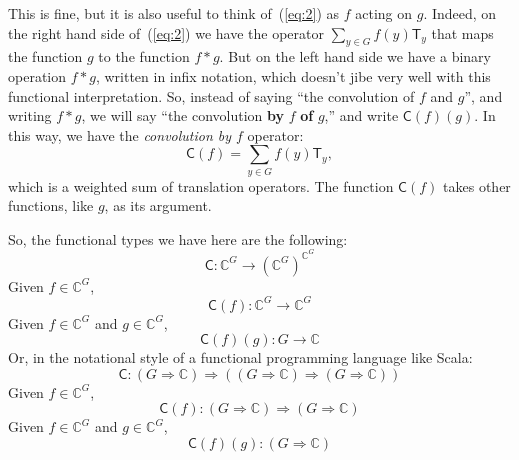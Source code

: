 \documentclass[11pt]{article}
\newcommand\C{\ensuremath{\mathbb{C}}}
\newcommand{\lt}[1]{\ensuremath{\mathsf{#1}}}
\newcommand{\T}{\lt{T}}       %
\newcommand\conv{\lt{C}}
\begin{document}
 This is fine, but it is also useful to think of~(\ref{eq:2}) as $f$ acting
on $g$.  Indeed, on the right hand side of~(\ref{eq:2}) we have the operator 
$\sum_{y \in G} f(y) \T_y$ that maps the function $g$ to the function $f*g$.  But
on the left hand side we have a binary operation $f*g$, written in infix
notation, which doesn't jibe very well with this functional interpretation.  So,
instead of saying ``the convolution of $f$ and $g$'', and writing $f*g$, we will
say
``the convolution {\bf by} $f$ {\bf of} $g$,'' and write $\conv(f)(g)$. In this
way, we have the \emph{convolution by $f$} operator:
\begin{equation}
\label{eq:3}  
\conv(f) = \sum_{y \in G} f(y) \T_y,
\end{equation}
which is a weighted sum of translation operators.  The function $\conv(f)$ takes other
functions, like $g$, as its argument.

So, the functional types we have here are the following:
\[
\conv : \C^G \rightarrow (\C^G)^{\C^G}
\]
Given $f\in \C^G$,
\[
\conv(f) : \C^G \rightarrow \C^G
\]
Given $f\in \C^G$ and $g\in \C^G$,
\[
\conv(f)(g) : G \rightarrow \C
\]
Or, in the notational style of a functional programming language like Scala:
\[
\conv : (G \Rightarrow \C) \Rightarrow ( (G \Rightarrow \C) \Rightarrow (G \Rightarrow \C) )
\]
Given $f\in \C^G$,
\[
\conv(f) : (G \Rightarrow \C) \Rightarrow (G \Rightarrow \C)
\]
Given $f\in \C^G$ and $g\in \C^G$,
\[
\conv(f)(g) : (G \Rightarrow \C)
\]

\newpage
\end{document}
